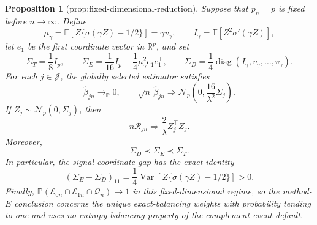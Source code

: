 \documentclass{article}
\newtheorem{proposition}{Proposition}
\begin{document}
\begin{proposition}[prop:fixed-dimensional-reduction]\label{prop:fixed-dimensional-reduction}
Suppose that \(p_n=p\) is fixed before \(n\to\infty\).  Define
\[
 \mu_\gamma=\mathbb E\!\left[Z\{\sigma(\gamma Z)-1/2\}\right]
 =\gamma v_\gamma,
 \qquad
 I_\gamma=\mathbb E\!\left[Z^2\sigma'(\gamma Z)\right],
\]
let \(e_1\) be the first coordinate vector in \(\mathbb R^p\), and set
\[
 \Sigma_T=\frac18 I_p,
 \qquad
 \Sigma_E=\frac1{16}I_p-\frac14\mu_\gamma^2e_1e_1^\top,
 \qquad
 \Sigma_D=\frac14\operatorname{diag}(I_\gamma,v_\gamma,\ldots,v_\gamma).
\]
For each \(j\in\mathcal J\), the globally selected estimator satisfies
\[
 \widehat\beta_{jn}\longrightarrow_{\mathbb P}0,
 \qquad
 \sqrt n\,\widehat\beta_{jn}\Rightarrow
 \mathcal N_p\!\left(0,\frac{16}{\lambda^2}\Sigma_j\right).
\]
If \(Z_j\sim\mathcal N_p(0,\Sigma_j)\), then
\[
 n\mathcal R_{jn}\Rightarrow \frac2\lambda Z_j^\top Z_j.
\]
Moreover,
\[
 \Sigma_D\prec\Sigma_E\prec\Sigma_T.
\]
In particular, the signal-coordinate gap has the exact identity
\[
 (\Sigma_E-\Sigma_D)_{11}
 =\frac14\operatorname{Var}\!\left[Z\{\sigma(\gamma Z)-1/2\}\right]>0.
\]
Finally, \(\mathbb P(\mathcal E_{0n}\cap\mathcal E_{1n}\cap\mathcal Q_n)\to1\) in this fixed-dimensional regime, so the method-\(E\) conclusion concerns the unique exact-balancing weights with probability tending to one and uses no entropy-balancing property of the complement-event default.
\end{proposition}
\end{document}
